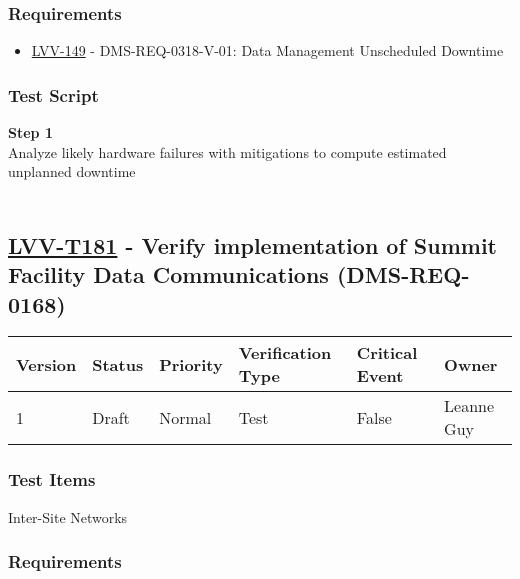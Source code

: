 \hypertarget{requirements-157}{%
\subsubsection{Requirements}\label{requirements-157}}

\begin{itemize}
\tightlist
\item
  \href{https://jira.lsstcorp.org/browse/LVV-149}{LVV-149} -
  DMS-REQ-0318-V-01: Data Management Unscheduled Downtime
\end{itemize}

\hypertarget{test-script-157}{%
\subsubsection{Test Script}\label{test-script-157}}

\textbf{Step 1}\\
Analyze likely hardware failures with mitigations to compute estimated
unplanned downtime\\
~\\

\hypertarget{lvv-t181---verify-implementation-of-summit-facility-data-communications-dms-req-0168}{%
\subsection{\texorpdfstring{\href{https://jira.lsstcorp.org/secure/Tests.jspa\#/testCase/LVV-T181}{LVV-T181}
- Verify implementation of Summit Facility Data Communications
(DMS-REQ-0168)}{LVV-T181 - Verify implementation of Summit Facility Data Communications (DMS-REQ-0168)}}\label{lvv-t181---verify-implementation-of-summit-facility-data-communications-dms-req-0168}}

\begin{longtable}[]{@{}llllll@{}}
\toprule
Version & Status & Priority & Verification Type & Critical Event &
Owner\tabularnewline
\midrule
\endhead
1 & Draft & Normal & Test & False & Leanne Guy\tabularnewline
\bottomrule
\end{longtable}

\hypertarget{test-items-157}{%
\subsubsection{Test Items}\label{test-items-157}}

Inter-Site Networks~

\hypertarget{requirements-158}{%
\subsubsection{Requirements}\label{requirements-158}}

